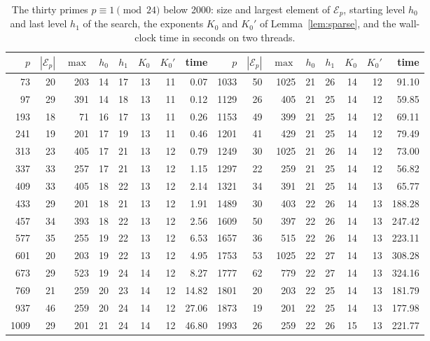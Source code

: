\documentclass[12pt]{amsart}
\theoremstyle{definition}
\newcommand{\cE}{\mathcal{E}}
\begin{document}
\begin{table}[ht]
\caption{The thirty primes $p\equiv1\pmod{24}$ below 2000: size and largest element of $\cE_p$, starting level $h_0$ and last level $h_1$ of the search, the exponents $K_0$ and $K_0'$ of Lemma~\ref{lem:sparse}, and the wall-clock time in seconds on two threads.}\label{tab:primes}
\small
\begin{tabular}{rrrrrrrr@{\qquad}rrrrrrrr}
\hline
$p$ & $|\cE_p|$ & $\max$ & $h_0$ & $h_1$ & $K_0$ & $K_0'$ & time & $p$ & $|\cE_p|$ & $\max$ & $h_0$ & $h_1$ & $K_0$ & $K_0'$ & time\\
\hline
73 & 20 & 203 & 14 & 17 & 13 & 11 & 0.07 & 1033 & 50 & 1025 & 21 & 26 & 14 & 12 & 91.10\\
97 & 29 & 391 & 14 & 18 & 13 & 11 & 0.12 & 1129 & 26 & 405 & 21 & 25 & 14 & 12 & 59.85\\
193 & 18 & 71 & 16 & 17 & 13 & 11 & 0.26 & 1153 & 49 & 399 & 21 & 25 & 14 & 12 & 69.11\\
241 & 19 & 201 & 17 & 19 & 13 & 11 & 0.46 & 1201 & 41 & 429 & 21 & 25 & 14 & 12 & 79.49\\
313 & 23 & 405 & 17 & 21 & 13 & 12 & 0.79 & 1249 & 30 & 1025 & 21 & 26 & 14 & 12 & 73.00\\
337 & 33 & 257 & 17 & 21 & 13 & 12 & 1.15 & 1297 & 22 & 259 & 21 & 25 & 14 & 12 & 56.82\\
409 & 33 & 405 & 18 & 22 & 13 & 12 & 2.14 & 1321 & 34 & 391 & 21 & 25 & 14 & 13 & 65.77\\
433 & 29 & 201 & 18 & 21 & 13 & 12 & 1.91 & 1489 & 30 & 403 & 22 & 26 & 14 & 13 & 188.28\\
457 & 34 & 393 & 18 & 22 & 13 & 12 & 2.56 & 1609 & 50 & 397 & 22 & 26 & 14 & 13 & 247.42\\
577 & 35 & 255 & 19 & 22 & 13 & 12 & 6.53 & 1657 & 36 & 515 & 22 & 26 & 14 & 13 & 223.11\\
601 & 20 & 203 & 19 & 22 & 13 & 12 & 4.95 & 1753 & 53 & 1025 & 22 & 27 & 14 & 13 & 308.28\\
673 & 29 & 523 & 19 & 24 & 14 & 12 & 8.27 & 1777 & 62 & 779 & 22 & 27 & 14 & 13 & 324.16\\
769 & 21 & 259 & 20 & 23 & 14 & 12 & 14.82 & 1801 & 20 & 203 & 22 & 25 & 14 & 13 & 181.79\\
937 & 46 & 259 & 20 & 24 & 14 & 12 & 27.06 & 1873 & 19 & 201 & 22 & 25 & 14 & 13 & 177.98\\
1009 & 29 & 201 & 21 & 24 & 14 & 12 & 46.80 & 1993 & 26 & 259 & 22 & 26 & 15 & 13 & 221.77\\
\hline
\end{tabular}
\end{table}
\end{document}
